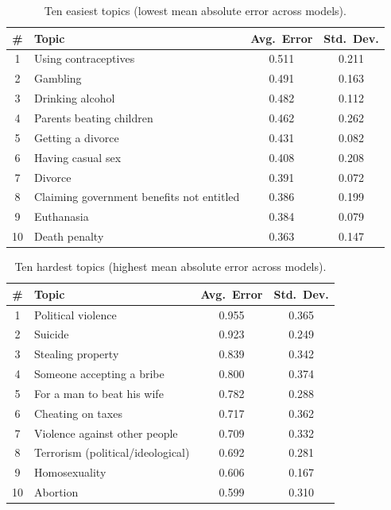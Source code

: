 \documentclass[runningheads]{llncs}
\begin{document}
\begin{table}[t]
\centering
\small
\caption{Ten easiest topics (lowest mean absolute error across models).}
\label{tab:EasiestTopics}
\begin{tabularx}{\textwidth}{@{} c Y S[table-format=1.3] S[table-format=1.3] @{}}
\toprule
\# & Topic & {Avg.\ Error} & {Std.\ Dev.} \\
  & Using contraceptives                         & 0.511 & 0.211 \\
2  & Gambling                                     & 0.491 & 0.163 \\
3  & Drinking alcohol                             & 0.482 & 0.112 \\
4  & Parents beating children                     & 0.462 & 0.262 \\
5  & Getting a divorce                            & 0.431 & 0.082 \\
6  & Having casual sex                            & 0.408 & 0.208 \\
7  & Divorce                                      & 0.391 & 0.072 \\
8  & Claiming government benefits not entitled    & 0.386 & 0.199 \\
9  & Euthanasia                                   & 0.384 & 0.079 \\
10 & Death penalty                                & 0.363 & 0.147 \\
\bottomrule
\end{tabularx}
\end{table}

\begin{table}[t]
\centering
\small
\caption{Ten hardest topics (highest mean absolute error across models).}
\label{tab:HardestTopics}
\begin{tabularx}{\textwidth}{@{} c Y S[table-format=1.3] S[table-format=1.3] @{}}
\toprule
\# & Topic & {Avg.\ Error} & {Std.\ Dev.} \\
  & Political violence                           & 0.955 & 0.365 \\
2  & Suicide                                      & 0.923 & 0.249 \\
3  & Stealing property                            & 0.839 & 0.342 \\
4  & Someone accepting a bribe                    & 0.800 & 0.374 \\
5  & For a man to beat his wife                   & 0.782 & 0.288 \\
6  & Cheating on taxes                            & 0.717 & 0.362 \\
7  & Violence against other people                & 0.709 & 0.332 \\
8  & Terrorism (political/ideological)            & 0.692 & 0.281 \\
9  & Homosexuality                                & 0.606 & 0.167 \\
10 & Abortion                                     & 0.599 & 0.310 \\
\bottomrule
\end{tabularx}
\end{table}
\end{document}
